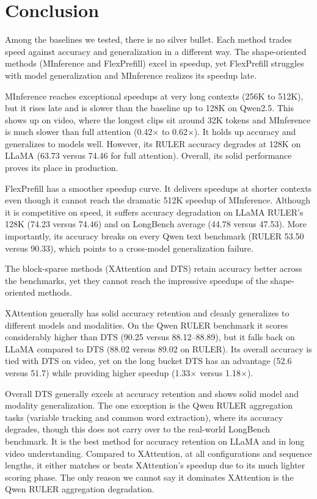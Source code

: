 \section{Conclusion}


Among the baselines we tested, there is no silver bullet. Each method trades speed against accuracy and generalization in a different way. The shape-oriented methods (MInference and FlexPrefill) excel in speedup, yet FlexPrefill struggles with model generalization and MInference realizes its speedup late.

MInference reaches exceptional speedups at very long contexts (256K to 512K), but it rises late and is slower than the baseline up to 128K on Qwen2.5. This shows up on video, where the longest clips sit around 32K tokens and MInference is much slower than full attention (0.42$\times$ to 0.62$\times$). It holds up accuracy and generalizes to models well. However, its RULER accuracy degrades at 128K on LLaMA (63.73 versus 74.46 for full attention). Overall, its solid performance proves its place in production.

FlexPrefill has a smoother speedup curve. It delivers speedups at shorter contexts even though it cannot reach the dramatic 512K speedup of MInference. Although it is competitive on speed, it suffers accuracy degradation on LLaMA RULER's 128K (74.23 versus 74.46) and on LongBench average (44.78 versus 47.53). More importantly, its accuracy breaks on every Qwen text benchmark (RULER 53.50 versus 90.33), which points to a cross-model generalization failure.

The block-sparse methods (XAttention and DTS) retain accuracy better across the benchmarks, yet they cannot reach the impressive speedups of the shape-oriented methods.

XAttention generally has solid accuracy retention and cleanly generalizes to different models and modalities. On the Qwen RULER benchmark it scores considerably higher than DTS (90.25 versus 88.12--88.89), but it falls back on LLaMA compared to DTS (88.02 versus 89.02 on RULER). Its overall accuracy is tied with DTS on video, yet on the long bucket DTS has an advantage (52.6 versus 51.7) while providing higher speedup (1.33$\times$ versus 1.18$\times$).


Overall DTS generally excels at accuracy retention and shows solid model and modality generalization. The one exception is the Qwen RULER aggregation tasks (variable tracking and common word extraction), where its accuracy degrades, though this does not carry over to the real-world LongBench benchmark. It is the best method for accuracy retention on LLaMA and in long video understanding. Compared to XAttention, at all configurations and sequence lengths, it either matches or beats XAttention's speedup due to its much lighter scoring phase. The only reason we cannot say it dominates XAttention is the Qwen RULER aggregation degradation.


